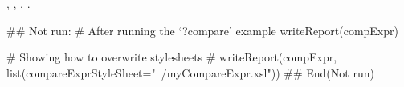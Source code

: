 \documentclass[a4paper,oneside]{report}
\begin{document}
\begin{SeeAlso}\relax
{}, ,
, .
\end{SeeAlso}
\begin{Examples}
\begin{ExampleCode}
## Not run: 
  # After running the `?compare' example
  writeReport(compExpr)

  # Showing how to overwrite stylesheets
  # writeReport(compExpr, list(compareExprStyleSheet="~/myCompareExpr.xsl"))
## End(Not run)
\end{ExampleCode}
\end{Examples}

\printindex{}
\end{document}
